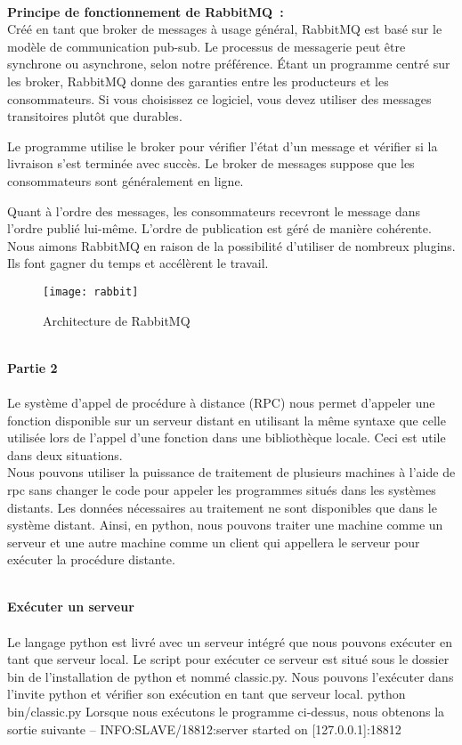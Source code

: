 \textbf{\\Principe de fonctionnement de RabbitMQ :}\\
Créé en tant que broker de messages à usage général, RabbitMQ est basé sur le modèle de communication pub-sub. Le processus de messagerie peut être synchrone ou asynchrone, selon notre préférence.
Étant un programme centré sur les broker, RabbitMQ donne des garanties entre les producteurs et les consommateurs. Si vous choisissez ce logiciel, vous devez utiliser des messages transitoires plutôt que durables.

Le programme utilise le broker pour vérifier l'état d'un message et vérifier si la livraison s'est terminée avec succès. Le broker de messages suppose que les consommateurs sont généralement en ligne.

Quant à l'ordre des messages, les consommateurs recevront le message dans l'ordre publié lui-même. L'ordre de publication est géré de manière cohérente.
Nous aimons RabbitMQ en raison de la possibilité d'utiliser de nombreux plugins. Ils font gagner du temps et accélèrent le travail.
\begin{figure}[!ht]
	\centering
	\texttt{[image: rabbit]}
	\caption{Architecture de RabbitMQ}\label{rabbit}
\end{figure}

\textbf{\\Partie 2}\\\\
Le système d'appel de procédure à distance (RPC) nous permet d'appeler une fonction disponible sur un serveur distant en utilisant la même syntaxe que celle utilisée lors de l'appel d'une fonction dans une bibliothèque locale. Ceci est utile dans deux situations.\\
Nous pouvons utiliser la puissance de traitement de plusieurs machines à l'aide de rpc sans changer le code pour appeler les programmes situés dans les systèmes distants.
Les données nécessaires au traitement ne sont disponibles que dans le système distant.
Ainsi, en python, nous pouvons traiter une machine comme un serveur et une autre machine comme un client qui appellera le serveur pour exécuter la procédure distante.

\textbf{\\Exécuter un serveur}\\\\
Le langage python est livré avec un serveur intégré que nous pouvons exécuter en tant que serveur local. Le script pour exécuter ce serveur est situé sous le dossier bin de l'installation de python et nommé classic.py. Nous pouvons l'exécuter dans l'invite python et vérifier son exécution en tant que serveur local.
python bin/classic.py
Lorsque nous exécutons le programme ci-dessus, nous obtenons la sortie suivante –
INFO:SLAVE/18812:server started on [127.0.0.1]:18812


